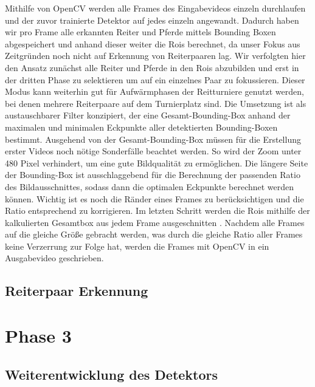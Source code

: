 Mithilfe von OpenCV werden alle Frames des Eingabevideos einzeln durchlaufen und der zuvor trainierte Detektor auf jedes einzeln angewandt. Dadurch haben wir pro Frame alle erkannten Reiter und Pferde mittels Bounding Boxen abgespeichert und anhand dieser weiter die Rois berechnet, da unser Fokus aus Zeitgründen noch nicht auf Erkennung von Reiterpaaren lag. Wir verfolgten hier den Ansatz zunächst alle Reiter und Pferde in den Rois abzubilden und erst in der dritten Phase zu selektieren um auf ein einzelnes Paar zu fokussieren. Dieser Modus kann weiterhin gut für Aufwärmphasen der Reitturniere genutzt werden, bei denen mehrere Reiterpaare auf dem Turnierplatz sind. Die Umsetzung ist als austauschbarer Filter konzipiert, der eine Gesamt-Bounding-Box anhand der maximalen und minimalen Eckpunkte aller detektierten Bounding-Boxen bestimmt.
Ausgehend von der Gesamt-Bounding-Box müssen für die Erstellung erster Videos noch nötige Sonderfälle beachtet werden. So wird der Zoom unter 480 Pixel verhindert, um eine gute Bildqualität zu ermöglichen. Die längere Seite der Bounding-Box ist ausschlaggebend für die Berechnung der passenden Ratio des Bildausschnittes, sodass dann die optimalen  Eckpunkte berechnet werden können. Wichtig ist es noch die Ränder eines Frames zu berücksichtigen und die Ratio entsprechend zu korrigieren.
Im letzten Schritt werden die Rois mithilfe der kalkulierten Gesamtbox aus jedem Frame ausgeschnitten  . Nachdem alle Frames auf die gleiche Größe gebracht werden, was durch die gleiche Ratio aller Frames keine Verzerrung zur Folge hat, werden die Frames mit OpenCV in ein Ausgabevideo geschrieben.

\subsection*{Reiterpaar Erkennung}



\section{Phase 3}
\subsection*{Weiterentwicklung des Detektors}

